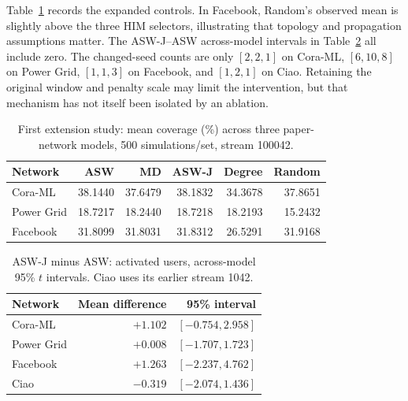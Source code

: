 Table~\ref{tab:him-first-controls} records the expanded controls. In Facebook, Random's observed mean is slightly above the three HIM selectors, illustrating that topology and propagation assumptions matter. The ASW-J--ASW across-model intervals in Table~\ref{tab:aswj} all include zero. The changed-seed counts are only $[2,2,1]$ on Cora-ML, $[6,10,8]$ on Power Grid, $[1,1,3]$ on Facebook, and $[1,2,1]$ on Ciao. Retaining the original window and penalty scale may limit the intervention, but that mechanism has not itself been isolated by an ablation.

\begin{table}[t]
\centering\scriptsize
\setlength{\tabcolsep}{3pt}
\caption{First extension study: mean coverage (\%) across three paper-network models, 500 simulations/set, stream 100042.}
\label{tab:him-first-controls}
\begin{tabular}{@{}lrrrrr@{}}
\toprule
Network & ASW & MD & ASW-J & Degree & Random \\
\midrule
Cora-ML & 38.1440 & 37.6479 & 38.1832 & 34.3678 & 37.8651 \\
Power Grid & 18.7217 & 18.2440 & 18.7218 & 18.2193 & 15.2432 \\
Facebook & 31.8099 & 31.8031 & 31.8312 & 26.5291 & 31.9168 \\
\bottomrule
\end{tabular}
\end{table}

\begin{table}[t]
\centering\footnotesize
\setlength{\tabcolsep}{4pt}
\caption{ASW-J minus ASW: activated users, across-model 95\% $t$ intervals. Ciao uses its earlier stream 1042.}
\label{tab:aswj}
\begin{tabular}{@{}lrr@{}}
\toprule
Network & Mean difference & 95\% interval \\
\midrule
Cora-ML & $+1.102$ & $[-0.754, 2.958]$ \\
Power Grid & $+0.008$ & $[-1.707, 1.723]$ \\
Facebook & $+1.263$ & $[-2.237, 4.762]$ \\
Ciao & $-0.319$ & $[-2.074, 1.436]$ \\
\bottomrule
\end{tabular}
\end{table}

